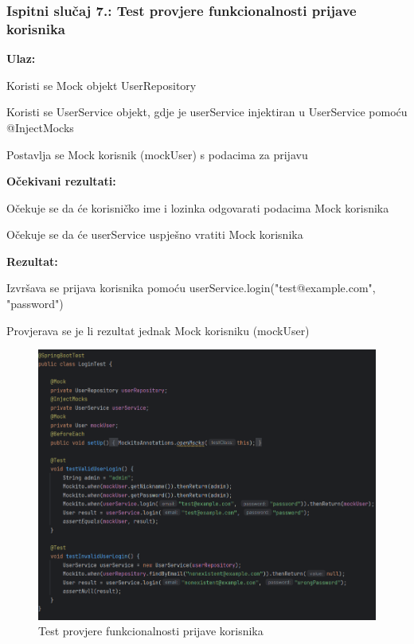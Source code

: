         


            \subsubsection{Ispitni slučaj 7.: Test provjere funkcionalnosti prijave korisnika}
            
             \noindent\textbf{Ulaz:}
            \begin{packed_item}
            	\item Koristi se Mock objekt UserRepository
            	\item Koristi se UserService objekt, gdje je userService injektiran u UserService pomoću @InjectMocks
            	\item Postavlja se Mock korisnik (mockUser) s podacima za prijavu
            \end{packed_item}
            
            \noindent\textbf{Očekivani rezultati:}
            \begin{packed_item}
            	\item Očekuje se da će korisničko ime i lozinka odgovarati podacima Mock korisnika
            	\item Očekuje se da će userService uspješno vratiti Mock korisnika
            	
            \end{packed_item}
            \noindent\textbf{Rezultat:}
            \begin{packed_item}
            	\item  Izvršava se prijava korisnika pomoću userService.login("test@example.com", "password")
            	\item  Provjerava se je li rezultat jednak Mock korisniku (mockUser)
            \end{packed_item}
				\begin{figure} [H]
					\centering
					\includegraphics[width=0.7\linewidth]{slike/LoginTest.png}
					\caption{Test provjere funkcionalnosti prijave korisnika}
					\label{fig:Test provjere funkcionalnosti prijave korisnika}
				\end{figure}
                                                                                           
